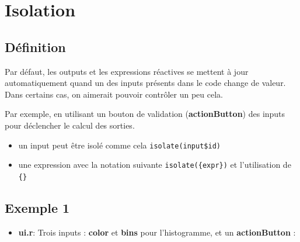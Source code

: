 \documentclass[
]{article}
\providecommand{\tightlist}{%
  \setlength{\itemsep}{0pt}\setlength{\parskip}{0pt}}
\begin{document}
\hypertarget{isolation}{%
\section{Isolation}\label{isolation}}

\hypertarget{duxe9finition}{%
\subsection{Définition}\label{duxe9finition}}

Par défaut, les outputs et les expressions réactives se mettent à jour
automatiquement quand un des inputs présents dans le code change de
valeur. Dans certains cas, on aimerait pouvoir contrôler un peu cela.

Par exemple, en utilisant un bouton de validation
(\textbf{actionButton}) des inputs pour déclencher le calcul des
sorties.

\begin{itemize}
\item
  un input peut être isolé comme cela \texttt{isolate(input\$id)}
\item
  une expression avec la notation suivante \texttt{isolate(\{expr\})} et
  l'utilisation de \texttt{\{\}}
\end{itemize}

\hypertarget{exemple-1}{%
\subsection{Exemple 1}\label{exemple-1}}

\begin{itemize}
\tightlist
\item
  \textbf{ui.r}: Trois inputs : \textbf{color} et \textbf{bins} pour
  l'histogramme, et un \textbf{actionButton} :
\end{itemize}
\end{document}
